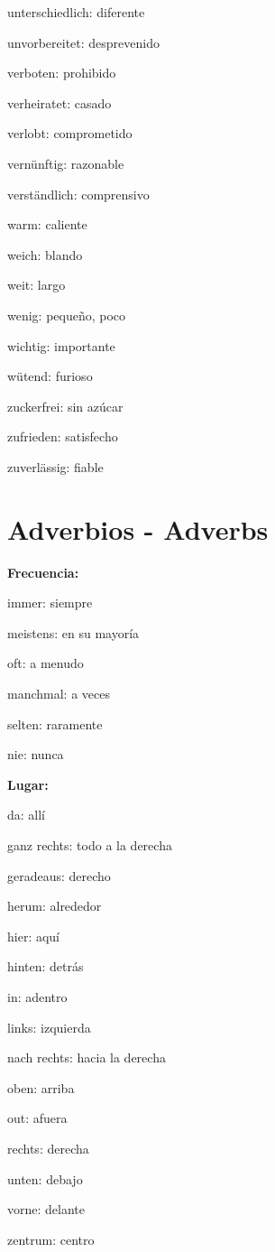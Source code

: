 \begin{multicols}{2}
\begin{myitemize}
\item unterschiedlich: diferente
\item unvorbereitet: desprevenido
\item verboten: prohibido
\item verheiratet: casado
\item verlobt: comprometido
\item vernünftig: razonable
\item verständlich: comprensivo
\item warm: caliente
\item weich: blando
\item weit: largo
\item wenig: pequeño, poco
\item wichtig: importante
\item wütend: furioso
\item zuckerfrei: sin azúcar
\item zufrieden: satisfecho
\item zuverlässig: fiable
\end{myitemize}
\end{multicols}

\section{Adverbios - Adverbs}
\textbf{Frecuencia:}
\begin{myitemize}
\item immer: siempre
\item meistens: en su mayoría
\item oft: a menudo
\item manchmal: a veces
\item selten: raramente
\item nie: nunca
\end{myitemize}

\textbf{Lugar:}
\begin{myitemize}
\item da: allí
\item ganz rechts: todo a la derecha
\item geradeaus: derecho
\item herum: alrededor
\item hier: aquí
\item hinten: detrás
\item in: adentro
\item links: izquierda
\item nach rechts: hacia la derecha
\item oben: arriba
\item out: afuera
\item rechts: derecha
\item unten: debajo
\item vorne: delante
\item zentrum: centro
\end{myitemize}

